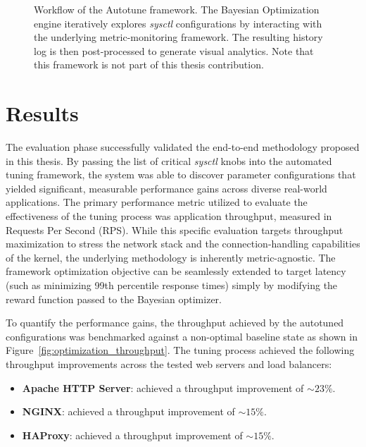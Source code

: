 \begin{figure}[htbp]
{%
    }
    \caption{Workflow of the Autotune framework. The Bayesian Optimization engine iteratively explores \textit{sysctl} configurations by interacting with the underlying metric-monitoring framework. The resulting history log is then post-processed to generate visual analytics. Note that this framework is not part of this thesis contribution.}
    \label{fig:autotune_workflow}
\end{figure}

\section{Results}

The evaluation phase successfully validated the end-to-end methodology proposed in this thesis.
By passing the list of critical \textit{sysctl} knobs into the automated tuning framework, the system was able to discover parameter configurations that yielded significant, measurable performance gains across diverse real-world applications.
The primary performance metric utilized to evaluate the effectiveness of the tuning process was application throughput, measured in Requests Per Second (RPS).
While this specific evaluation targets throughput maximization to stress the network stack and the connection-handling capabilities of the kernel, the underlying methodology is inherently metric-agnostic.
The framework optimization objective can be seamlessly extended to target latency (such as minimizing 99th percentile response times) simply by modifying the reward function passed to the Bayesian optimizer.

To quantify the performance gains, the throughput achieved by the autotuned configurations was benchmarked against a non-optimal baseline state as shown in Figure~\ref{fig:optimization_throughput}.
The tuning process achieved the following throughput improvements across the tested web servers and load balancers:
\begin{itemize}
    \item \textbf{Apache HTTP Server}: achieved a throughput improvement of $\sim 23\%$.
    \item \textbf{NGINX}: achieved a throughput improvement of $\sim 15\%$.
    \item \textbf{HAProxy}: achieved a throughput improvement of $\sim 15\%$.
\end{itemize}

